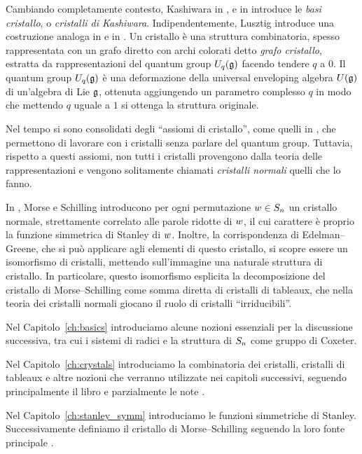 Cambiando completamente contesto, Kashiwara in \cite{kashiwara1990}, \cite{kashiwara1991}
e in \cite{kashiwara1995crystal}
introduce le \emph{basi cristallo}, o \emph{cristalli di Kashiwara}.
Indipendentemente, Lusztig introduce una costruzione analoga 
in \cite{lusztig1990a} e in \cite{lusztig1990b}.
Un cristallo \`e una struttura combinatoria, spesso rappresentata con un grafo
diretto con archi colorati detto \emph{grafo cristallo}, estratta da rappresentazioni del
quantum group $U_q(\mathfrak{g})$ facendo tendere $q$ a $0$.
Il quantum group $U_q(\mathfrak{g})$ \`e
una deformazione della universal enveloping algebra $U(\mathfrak{g})$
di un'algebra di Lie $\mathfrak{g}$,
ottenuta aggiungendo un parametro complesso $q$
in modo che mettendo $q$ uguale a $1$ si ottenga la struttura originale.

Nel tempo si sono consolidati degli ``assiomi di cristallo'', come quelli in
\cite{bump-schilling-17},
che permettono di lavorare con i cristalli senza parlare del quantum group.
Tuttavia, rispetto a questi assiomi, non tutti i
cristalli provengono dalla teoria delle rappresentazioni e vengono solitamente
chiamati \emph{cristalli normali} quelli che lo fanno.

In \cite{morse-schilling-15}, Morse e Schilling introducono per ogni permutazione
$w \in S_n$ un cristallo normale, strettamente correlato alle parole ridotte di $w$,
il cui carattere \`e proprio la funzione simmetrica di Stanley di $w$.
Inoltre, la corrispondenza di Edelman--Greene, che si pu\`o applicare agli elementi
di questo cristallo, si scopre essere un isomorfismo di cristalli,
mettendo sull'immagine una naturale struttura di cristallo.
In particolare, questo isomorfismo  esplicita la decomposizione
del cristallo di Morse--Schilling come somma diretta di cristalli di tableaux,
che nella teoria dei cristalli normali giocano il ruolo di cristalli ``irriducibili''.

Nel Capitolo~\ref{ch:basics} introduciamo alcune nozioni essenziali per la discussione
successiva, tra cui i sistemi di radici e la struttura di $S_n$ come gruppo di Coxeter.

Nel Capitolo~\ref{ch:crystals} introduciamo la combinatoria dei cristalli, cristalli
di tableaux e altre nozioni che verranno utilizzate nei capitoli successivi,
seguendo principalmente il libro \cite{bump-schilling-17} e parzialmente le note
\cite{shimozono2005crystals}.

Nel Capitolo~\ref{ch:stanley_symm} introduciamo le funzioni simmetriche di Stanley.
Successivamente definiamo il cristallo di Morse--Schilling seguendo la loro
fonte principale \cite{morse-schilling-15}.

